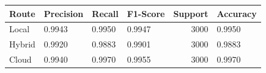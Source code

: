 \begin{tabular}{llllrl}
\toprule
Route & Precision & Recall & F1-Score & Support & Accuracy \\
\midrule
Local & 0.9943 & 0.9950 & 0.9947 & 3000 & 0.9950 \\
Hybrid & 0.9920 & 0.9883 & 0.9901 & 3000 & 0.9883 \\
Cloud & 0.9940 & 0.9970 & 0.9955 & 3000 & 0.9970 \\
\bottomrule
\end{tabular}
